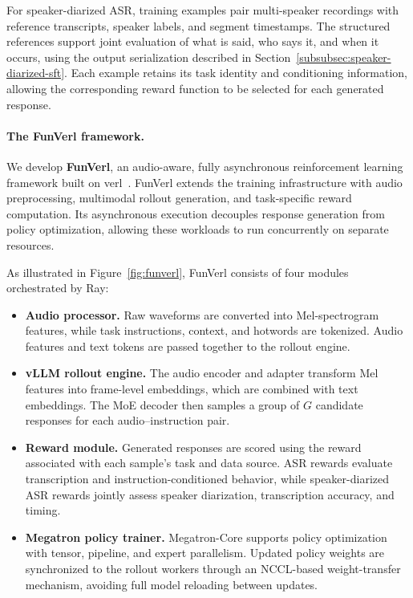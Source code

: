 \documentclass{article}
\begin{document}
For speaker-diarized ASR, training examples pair multi-speaker recordings with reference transcripts, speaker labels, and segment timestamps. The structured references support joint evaluation of what is said, who says it, and when it occurs, using the output serialization described in Section~\ref{subsubsec:speaker-diarized-sft}. Each example retains its task identity and conditioning information, allowing the corresponding reward function to be selected for each generated response.

\paragraph{The FunVerl framework.}
We develop \textbf{FunVerl}, an audio-aware, fully asynchronous reinforcement learning framework built on verl~\citep{sheng2024hybridflow}. FunVerl extends the training infrastructure with audio preprocessing, multimodal rollout generation, and task-specific reward computation. Its asynchronous execution decouples response generation from policy optimization, allowing these workloads to run concurrently on separate resources.

As illustrated in Figure~\ref{fig:funverl}, FunVerl consists of four modules orchestrated by Ray:

\begin{itemize}[leftmargin=*,noitemsep]
\item \textbf{Audio processor.} Raw waveforms are converted into Mel-spectrogram features, while task instructions, context, and hotwords are tokenized. Audio features and text tokens are passed together to the rollout engine.

\item \textbf{vLLM rollout engine.} The audio encoder and adapter transform Mel features into frame-level embeddings, which are combined with text embeddings. The MoE decoder then samples a group of $G$ candidate responses for each audio--instruction pair.

\item \textbf{Reward module.} Generated responses are scored using the reward associated with each sample's task and data source. ASR rewards evaluate transcription and instruction-conditioned behavior, while speaker-diarized ASR rewards jointly assess speaker diarization, transcription accuracy, and timing.

\item \textbf{Megatron policy trainer.} Megatron-Core supports policy optimization with tensor, pipeline, and expert parallelism. Updated policy weights are synchronized to the rollout workers through an NCCL-based weight-transfer mechanism, avoiding full model reloading between updates.
\end{itemize}
\end{document}
